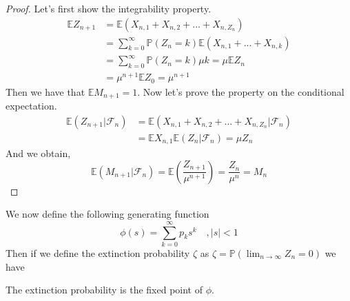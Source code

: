 \begin{proof}
	Let's first show the integrability property.
	\begin{align}
		\mathbb{E}Z_{n+1} 	&= \mathbb{E}(X_{n,1} + X_{n,2} + ... + X_{n, Z_n}) \\
					&= \sum_{k=0}^{\infty} \mathbb{P}(Z_n = k)\mathbb{E}(X_{n,1} + ... + X_{n,k})\\
					&= \sum_{k=0}^{\infty} \mathbb{P}(Z_n = k) \mu k = \mu \mathbb{E}Z_n \\
					&= \mu ^{n+1} \mathbb{E} Z_0 = \mu^{n+1}
	\end{align}
	Then we have that $\mathbb{E}M_{n+1} = 1$.
	\newline
	Now let's prove the property on the conditional expectation.
	\begin{align}
		\mathbb{E}(Z_{n+1} | \mathcal{F}_n) 	&= \mathbb{E}( X_{n,1} + X_{n,2} + ... + X_{n, Z_n} | \mathcal{F}_n ) \\
							&= \mathbb{E}X_{n, 1} \mathbb{E}(Z_n |\mathcal{F}_n ) = \mu Z_n
	\end{align}
	And we obtain,
	\begin{equation}
		\mathbb{E}(M_{n+1} | \mathcal{F}_n) = \mathbb{E}(\frac{Z_{n+1}}{\mu^{n+1}}) = \frac{Z_n}{\mu^n} = M_n
	\end{equation}
\end{proof}
We now define the following generating function
\begin{equation}
	\phi(s) = \sum_{k=0}^{\infty} p_k s^k \quad , |s| <1
\end{equation}
Then if we define the extinction probability $\zeta$ as $\zeta = \mathbb{P}(\lim_{n \to \infty} Z_n = 0)$
we have
\begin{theorem}
	The extinction probability is the fixed point of $\phi$.
\end{theorem}
